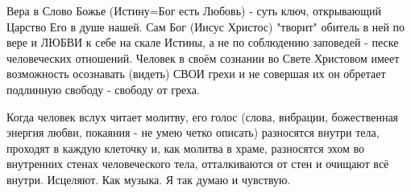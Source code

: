 \begin{itemize}
Вера в Слово Божье (Истину=Бог есть Любовь) - суть ключ, открывающий Царство
Его в душе нашей. Сам Бог (Иисус Христос) "творит" обитель в ней по вере и
ЛЮБВИ к себе на скале Истины, а не по соблюдению заповедей - песке человеческих
отношений. Человек в своём сознании во Свете Христовом имеет возможность
осознавать (видеть) СВОИ грехи и не совершая их он обретает подлинную свободу -
свободу от греха.


Когда человек вслух читает молитву, его голос (слова, вибрации, божественная
энергия любви, покаяния - не умею четко описать) разносятся внутри тела,
проходят в каждую клеточку и, как молитва в храме, разносятся эхом во
внутренних стенах человеческого тела, отталкиваются от стен и очищают всё
внутри. Исцеляют. Как музыка. Я так думаю и чувствую.

\end{itemize} %
